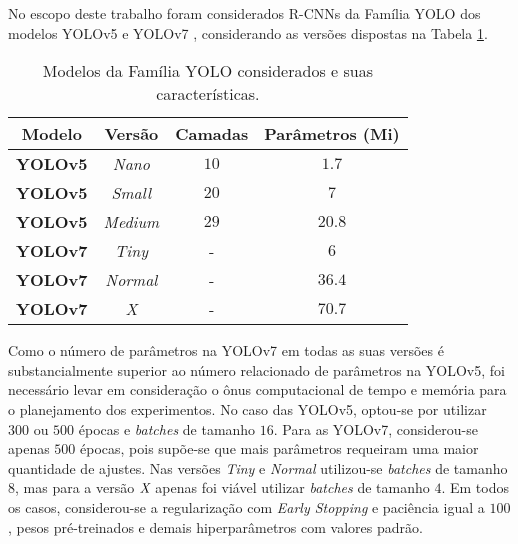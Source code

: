 
No escopo deste trabalho foram considerados R-CNNs da Família YOLO dos modelos YOLOv5 \cite{Jocher:YOLOv5} e YOLOv7 \cite{yolov7}, considerando as versões dispostas na Tabela \ref{tab:modelosExperimentos}.

\begin{table}[h!]
\caption{Modelos da Família YOLO considerados e suas características.} \label{tab:modelosExperimentos}
\begin{center}
\begin{tabular}{cccc}
\toprule
\textbf{Modelo} & \textbf{Versão} & \textbf{Camadas} & \textbf{Parâmetros (Mi)}\\
\midrule
\textbf{YOLOv5} & \emph{Nano} & $\num{10}$ & $\num{1.7}$\\
\textbf{YOLOv5} & \emph{Small} & $\num{20}$ & $\num{7}$\\
\textbf{YOLOv5} & \emph{Medium} & $\num{29}$ & $\num{20.8}$\\
\textbf{YOLOv7} & \emph{Tiny} & -  & $\num{6}$\\
\textbf{YOLOv7} & \emph{Normal} & -  & $\num{36.4}$\\
\textbf{YOLOv7} & \emph{X} & -  & $\num{70.7}$\\
\bottomrule
\end{tabular}
\end{center}
\end{table}

Como o número de parâmetros na YOLOv7 em todas as suas versões é substancialmente superior ao número relacionado de parâmetros na YOLOv5, foi necessário levar em consideração o ônus computacional de tempo e memória para o planejamento dos experimentos. No caso das YOLOv5, optou-se por utilizar $300$ ou $500$ épocas e \emph{batches} de tamanho $16$. Para as YOLOv7, considerou-se apenas $500$ épocas, pois supõe-se que mais parâmetros requeiram uma maior quantidade de ajustes. Nas versões \emph{Tiny} e \emph{Normal} utilizou-se \emph{batches} de tamanho $8$, mas para a versão $\emph{X}$ apenas foi viável utilizar \emph{batches} de tamanho $4$. Em todos os casos, considerou-se a regularização com \emph{Early Stopping} e paciência igual a $100$, pesos pré-treinados e demais hiperparâmetros com valores padrão.
